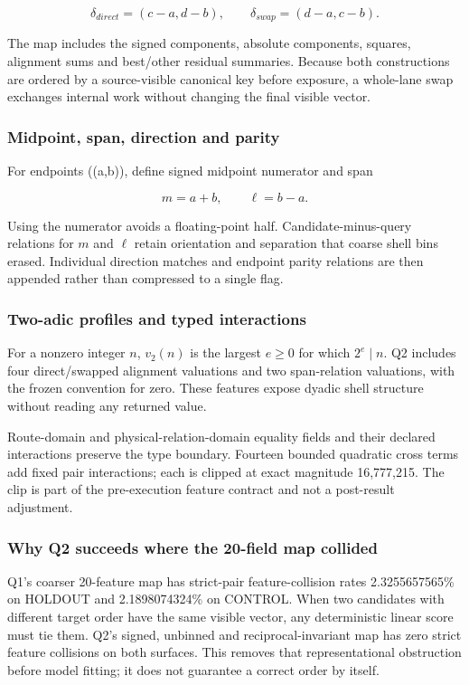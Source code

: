 \[
\delta_{direct}=(c-a,d-b),
\qquad
\delta_{swap}=(d-a,c-b).
\]

The map includes the signed components, absolute components, squares,
alignment sums and best/other residual summaries. Because both
constructions are ordered by a source-visible canonical key before
exposure, a whole-lane swap exchanges internal work without changing the
final visible vector.

\subsubsection{Midpoint, span, direction and
parity}\label{viii-ch07-midpoint-span-direction-and-parity}

For endpoints ((a,b)), define signed midpoint numerator and span

\[
m=a+b,
\qquad
\ell=b-a.
\]

Using the numerator avoids a floating-point half. Candidate-minus-query
relations for \(m\) and \(\ell\) retain orientation and separation that
coarse shell bins erased. Individual direction matches and endpoint
parity relations are then appended rather than compressed to a single
flag.

\subsubsection{Two-adic profiles and typed
interactions}\label{viii-ch07-two-adic-profiles-and-typed-interactions}

For a nonzero integer \(n\), \(v_2(n)\) is the largest \(e\ge0\) for
which \(2^e\mid n\). Q2 includes four direct/swapped alignment
valuations and two span-relation valuations, with the frozen convention
for zero. These features expose dyadic shell structure without reading
any returned value.

Route-domain and physical-relation-domain equality fields and their
declared interactions preserve the type boundary. Fourteen bounded
quadratic cross terms add fixed pair interactions; each is clipped at
exact magnitude 16,777,215. The clip is part of the pre-execution
feature contract and not a post-result adjustment.

\subsubsection{Why Q2 succeeds where the 20-field map
collided}\label{viii-ch07-why-q2-succeeds-where-the-20-field-map-collided}

Q1's coarser 20-feature map has strict-pair feature-collision rates
2.3255657565\% on HOLDOUT and 2.1898074324\% on CONTROL. When two
candidates with different target order have the same visible vector, any
deterministic linear score must tie them. Q2's signed, unbinned and
reciprocal-invariant map has zero strict feature collisions on both
surfaces. This removes that representational obstruction before model
fitting; it does not guarantee a correct order by itself.

